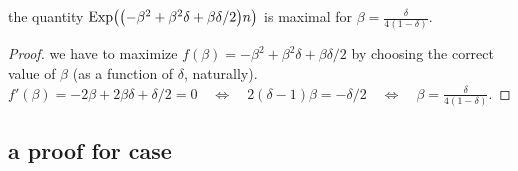 \begin{lemma}
    the quantity $\Exp\pth{ \pth[]{ -\beta^2 +\beta^2 \delta + \beta
          \delta /2 } n }$ is maximal for $ \beta =
    \frac{\delta}{4(1-\delta)}$.
\end{lemma}

\begin{proof}
    we have to maximize $f(\beta) = -\beta^2 +\beta^2 \delta + \beta
    \delta /2$ by choosing the correct value of $\beta$ (as a function
    of $\delta$, naturally).
    \begin{math}
        f'(\beta) = -2 \beta +2\beta \delta + \delta/2 = 0%
        \quad\iff\quad 2(\delta-1)\beta = - \delta/2 \quad\iff\quad
        \beta = \frac{\delta}{4(1-\delta)}.
    \end{math}
\end{proof}





\subsection{a proof for  case}

